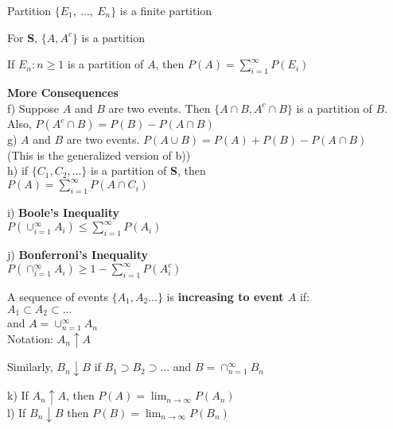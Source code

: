 \documentclass[12pt, oneside, letterpaper]{notes}
\begin{document}
\begin{remark}
	Partition $\{E_1, \: ..., \: E_n \}$ is a finite partition
\end{remark}

\begin{remark}
	For \textbf{S}, $\{A, A^c\}$ is a partition
\end{remark}

\begin{remark}
	If $E_n: n \geq 1$ is a partition of $A$, then $P(A) = \sum_{i=1}^{\infty} P(E_i)$
\end{remark}

\textbf{More Consequences} \\
f) Suppose $A$ and $B$ are two events.  Then $\{A \cap B, A^c \cap B\}$
	is a partition of $B$.  Also, $P(A^c \cap B) = P(B) - P(A \cap B)$ \\
g) $A$ and $B$ are two events.  $P(A \cup B) = P(A) + P(B) - P(A \cap B)$ \\
	\indent (This is the generalized version of b)) \\
h) if $\{C_1, C_2, ... \}$ is a partition of \textbf{S}, then \\
	\indent $P(A) = \sum_{i=1}^{\infty} P(A \cap C_i)$ \\

\begin{mydef}
	i) \textbf{Boole's Inequality} \\
	\indent $P(\cup_{i=1}^{\infty} A_i) \leq \sum_{i=1}^{\infty}P(A_i)$ \\
\end{mydef}

\begin{mydef}
	j) \textbf{Bonferroni's Inequality}\\
	\indent $P(\cap_{i=1}^{\infty} A_i) \geq 1 - \sum_{i=1}^{\infty} P(A_i^c)$
\end{mydef}

\begin{mydef}
	A sequence of events $\{A_1, A_2 ...\}$ is \textbf{increasing to event $A$} if: \\
	\indent $A_1 \subset A_2 \subset ...$  \\
	\indent and $A = \cup_{n=1}^{\infty} A_n$ \\
	Notation: $A_n \uparrow A$
\end{mydef}

\begin{mydef}
	Similarly, $B_n \downarrow B$ if $B_1 \supset B_2 \supset ... $ and
	$B = \cap_{n=1}^{\infty} B_n$ \\
\end{mydef}
	
k) If $A_n \uparrow A$, then $P(A) = \lim_{n \to \infty} P(A_n)$ \\
l) If $B_n \downarrow B$ then $P(B) = \lim_{n \to \infty} P(B_n)$ \\
\end{document}
